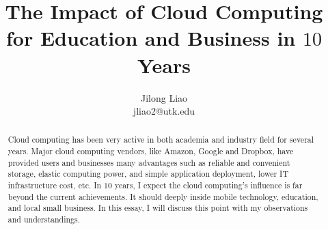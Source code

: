 \documentclass[11pt, times]{article}
\begin{document}
\title{The Impact of Cloud Computing for Education and Business in $10$ Years}
\author{Jilong Liao\\jliao2@utk.edu}
\maketitle

\begin{abstract}
Cloud computing has been very active in both academia and industry field for several years. Major cloud computing vendors, like Amazon, Google and Dropbox, have provided users and businesses many advantages such as reliable and convenient storage, elastic computing power, and simple application deployment, lower IT infrastructure cost, etc. In $10$ years, I expect the cloud computing's influence is far beyond the current achievements. It should deeply inside mobile technology, education, and local small business. In this essay, I will discuss this point with my observations and understandings.
\end{abstract}



{\footnotesize

}
\end{document}
